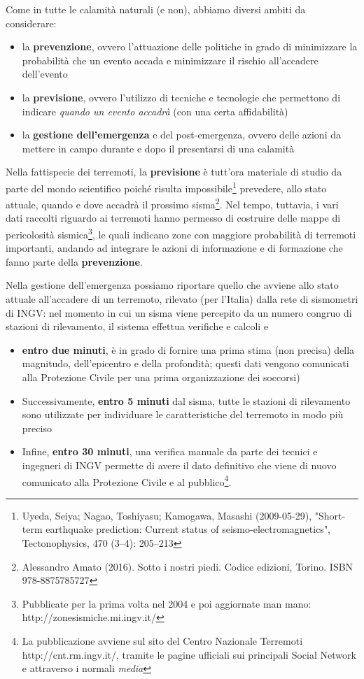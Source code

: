\documentclass[a4paper,10pt]{memoir}
\begin{document}
Come in tutte le calamità naturali (e non), abbiamo diversi ambiti da considerare:
\begin{itemize}
\item la \textbf{prevenzione}, ovvero l'attuazione delle politiche in grado di minimizzare la probabilità che un evento accada e minimizzare il rischio all'accadere dell'evento
\item la \textbf{previsione}, ovvero l'utilizzo di tecniche e tecnologie che permettono di indicare \textit{quando un evento accadrà} (con una certa affidabilità)
\item la \textbf{gestione dell'emergenza} e del post-emergenza, ovvero delle azioni da mettere in campo durante e dopo il presentarsi di una calamità
\end{itemize}

Nella fattispecie dei terremoti, la \textbf{previsione} è tutt'ora materiale di studio da parte del mondo scientifico poiché risulta impossibile\footnote{Uyeda, Seiya; Nagao, Toshiyasu; Kamogawa, Masashi (2009-05-29), "Short-term earthquake prediction: Current status of seismo-electromagnetics", Tectonophysics, 470 (3–4): 205–213} prevedere, allo stato attuale, quando e dove accadrà il prossimo sisma\footnote{Alessandro Amato (2016). Sotto i nostri piedi. Codice edizioni, Torino. ISBN 978-8875785727}. Nel tempo, tuttavia, i vari dati raccolti riguardo ai terremoti hanno permesso di costruire delle mappe di pericolosità sismica\footnote{Pubblicate per la prima volta nel 2004 e poi aggiornate man mano: http://zonesismiche.mi.ingv.it/}, le quali indicano zone con maggiore probabilità di terremoti importanti, andando ad integrare le azioni di informazione e di formazione che fanno parte della \textbf{prevenzione}.

Nella gestione dell'emergenza possiamo riportare quello che avviene allo stato attuale all'accadere di un terremoto, rilevato (per l'Italia) dalla rete di sismometri di INGV: nel momento in cui un sisma viene percepito da un numero congruo di stazioni di rilevamento, il sistema effettua verifiche e calcoli e
\begin{itemize}
\item \textbf{entro due minuti}, è in grado di fornire una prima stima (non precisa) della magnitudo, dell'epicentro e della profondità; questi dati vengono comunicati alla Protezione Civile per una prima organizzazione dei soccorsi)
\item Successivamente, \textbf{entro 5 minuti} dal sisma, tutte le stazioni di rilevamento sono utilizzate per individuare le caratteristiche del terremoto in modo più preciso
\item Infine, \textbf{entro 30 minuti}, una verifica manuale da parte dei tecnici e ingegneri di INGV permette di avere il dato definitivo che viene di nuovo comunicato alla Protezione Civile e al pubblico\footnote{La pubblicazione avviene sul sito del Centro Nazionale Terremoti http://cnt.rm.ingv.it/, tramite le pagine ufficiali sui principali Social Network e attraverso i normali \textit{media}}.
\end{itemize}
\end{document}
